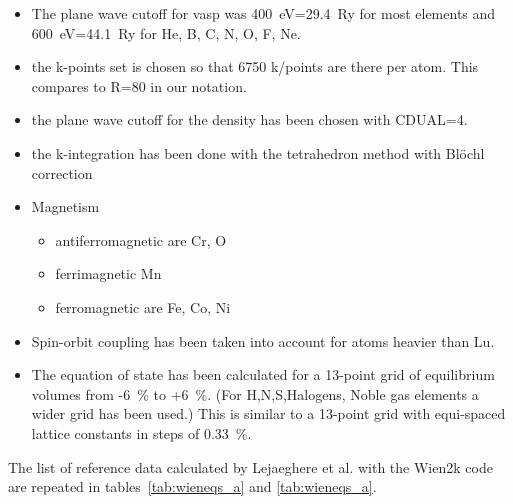 \documentclass[11pt,a4paper]{report}
\begin{document}
\begin{itemize}
\item The plane wave cutoff for vasp was 400~eV=29.4~Ry for most
elements and 600~eV=44.1~Ry for He, B, C, N, O, F, Ne.
\item the k-points set is chosen so that 6750 k/points are there per atom.
This compares to R=80 in our notation.
\item the plane wave cutoff for the density has been chosen with
  CDUAL=4.
\item the k-integration has been done with the tetrahedron method with
  Bl\"ochl correction
\item Magnetism
\begin{itemize}
\item antiferromagnetic are Cr, O
\item ferrimagnetic Mn
\item ferromagnetic are Fe, Co, Ni
\end{itemize}
\item Spin-orbit coupling has been taken into account for atoms
  heavier than Lu.
\item The equation of state has been calculated for a 13-point grid of
  equilibrium volumes from -6~\% to +6~\%. (For H,N,S,Halogens, Noble
  gas elements a wider grid has been used.)  This is similar to a
  13-point grid with equi-spaced lattice constants in steps of
  0.33~\%.
\end{itemize}

The list of reference data calculated by Lejaeghere et
al.\cite{lejaeghere14_critrevsolstmatsci39_1} with the Wien2k code are
repeated in tables~\ref{tab:wieneqs_a} and \ref{tab:wieneqs_a}.
\end{document}
